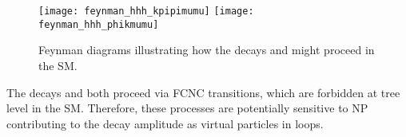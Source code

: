 



\begin{figure}
  \begin{center}
    \texttt{[image: feynman\_hhh\_kpipimumu]}
    \texttt{[image: feynman\_hhh\_phikmumu]}
    \caption[Feynman diagrams for \btokpipimumu and \btophikmumu]{\small
      Feynman diagrams illustrating how the decays \btokpipimumu and \btophikmumu might proceed in
      the SM.
    }
    \label{fig:hhh:feyn}
  \end{center}
\end{figure}


The decays \btokpipimumu and \btophikmumu both proceed via \decay{\bquark}{\squark\mumu} FCNC
transitions, which are forbidden at tree level in the SM.
Therefore, these processes are potentially sensitive to NP contributing
to the decay amplitude as virtual particles in loops.

